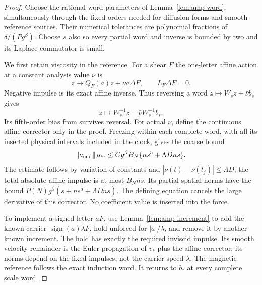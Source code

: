 \documentclass[11pt,a4paper]{amsart}
\theoremstyle{definition}
\theoremstyle{remark}
\numberwithin{equation}{section}
\newcommand{\norm}[1]{\lVert #1\rVert}
\begin{document}
\begin{proof}
Choose the rational word parameters of Lemma~\ref{lem:amp-word},
simultaneously through the fixed orders needed for diffusion forms
and smooth-reference sources.  Their numerical tolerances are
polynomial fractions of $\delta/(Pg^\beta)$.
Choose $s$ also so every partial word and inverse is bounded by two
and its Laplace commutator is small.

We first retain viscosity in the reference.  For a shear $F$ the
one-letter affine action at a constant analysis value $\bar\nu$ is
\[
 z\longmapsto Q_F(a)z+\bar\nu a\Delta F,\qquad
 L_F\Delta F=0.
\]
Negative impulse is its exact affine inverse.  Thus reversing a word
$z\mapsto W_sz+\bar\nu b_s$ gives
\begin{equation}\label{eq:amp-affine-inverse}
 z\longmapsto W_s^{-1}z-\bar\nu W_s^{-1}b_s .
\end{equation}
Its fifth-order bias from \cite[Lemma~4.7]{Common} survives reversal.
For actual $\nu$, define the continuous affine corrector only in the
proof.  Freezing within each complete word, with all its inserted
physical intervals included in the clock, gives the coarse bound
\begin{equation}\label{eq:amp-affine-error}
 \norm{a_{\rm end}}_{H^m}
 \le Cg^\beta B_N\{ns^5+\Lambda Dns\}.
\end{equation}
The estimate follows by variation of constants and
$|\nu(t)-\nu(t_j)|\le\Lambda D$; the total absolute affine impulse is
at most $B_Nns$.  Its partial spatial norms have the bound
$P(N)g^\beta(s+ns^5+\Lambda Dns)$.
The defining equation cancels the large derivative of this corrector.
No coefficient value is inserted into the force.

To implement a signed letter $aF$, use
Lemma~\ref{lem:amp-increment} to add the known carrier
$\operatorname{sign}(a)\lambda F$, hold unforced for $|a|/\lambda$,
and remove it by another known increment.  The hold has exactly the
required inviscid impulse.  Its smooth velocity remainder is the
Euler propagation of $v_*$ plus the affine corrector; its norms
depend on the fixed impulses, not the carrier speed $\lambda$.
The magnetic reference follows the exact induction word.
It returns to $b_*$ at every complete scale word.


\end{proof}
\end{document}
